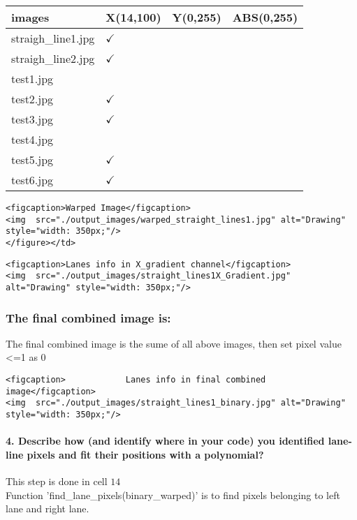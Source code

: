 \documentclass[11pt]{article}
\begin{document}
\begin{longtable}[]{@{}llll@{}}
\toprule
images & X(14,100) & Y(0,255) & ABS(0,255)\tabularnewline
\midrule
\endhead
straigh\_line1.jpg & \textbf{\(\checkmark\)} & &\tabularnewline
straigh\_line2.jpg & \textbf{\(\checkmark\)} & &\tabularnewline
test1.jpg & & &\tabularnewline
test2.jpg & \textbf{\(\checkmark\)} & &\tabularnewline
test3.jpg & \textbf{\(\checkmark\)} & &\tabularnewline
test4.jpg & & &\tabularnewline
test5.jpg & \textbf{\(\checkmark\)} & &\tabularnewline
test6.jpg & \textbf{\(\checkmark\)} & &\tabularnewline
\bottomrule
\end{longtable}

\begin{verbatim}
<figcaption>Warped Image</figcaption>
<img  src="./output_images/warped_straight_lines1.jpg" alt="Drawing" style="width: 350px;"/>
</figure></td>
\end{verbatim}

\begin{verbatim}
<figcaption>Lanes info in X_gradient channel</figcaption>
<img  src="./output_images/straight_lines1X_Gradient.jpg" alt="Drawing" style="width: 350px;"/>
\end{verbatim}

\subsubsection{The final combined image
is:}\label{the-final-combined-image-is}

The final combined image is the sume of all above images, then set pixel
value \textless{}=1 as 0

\begin{verbatim}
<figcaption>            Lanes info in final combined image</figcaption>
<img  src="./output_images/straight_lines1_binary.jpg" alt="Drawing" style="width: 350px;"/>
\end{verbatim}

\paragraph{4. Describe how (and identify where in your code) you
identified lane-line pixels and fit their positions with a
polynomial?}\label{describe-how-and-identify-where-in-your-code-you-identified-lane-line-pixels-and-fit-their-positions-with-a-polynomial}

This step is done in cell \(14\)\\
Function 'find\_lane\_pixels(binary\_warped)' is to find pixels
belonging to left lane and right lane.
\end{document}
